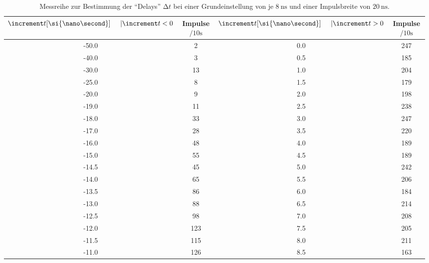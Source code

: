 \begin{table}
    \centering
    \caption{Messreihe zur Bestimmung der \enquote{Delays} $\increment t$ bei einer Grundeinstellung von je $\SI{8}{\nano\second}$ und einer Impulsbreite von $\SI{20}{\nano\second}$. } 
    \label{tab:MessreiheDelay20ns}
    \begin{tabular}{c c || c c}
        \toprule
        $\increment t [\si{\nano\second}] \hspace{0.5cm}| \increment t < 0 $ & Impulse $\si{\per{10}\second} $ & $\increment t [\si{\nano\second}] \hspace{0.5cm}|\increment t > 0 $ & Impulse $\si{\per{10}\second}$ \\
        \midrule
            -50.0    &      2     &   0.0       &     247   \\               
            -40.0    &      3     &   0.5     &     185   \\ 
            -30.0    &      13    &   1.0       &     204   \\     
            -25.0    &      8     &   1.5     &     179   \\ 
            -20.0    &      9     &   2.0       &     198   \\     
            -19.0    &      11    &   2.5     &     238   \\  
            -18.0    &      33    &   3.0       &     247   \\     
            -17.0    &      28    &   3.5     &     220   \\  
            -16.0    &      48    &   4.0       &     189   \\     
            -15.0    &      55    &   4.5     &     189   \\     
            -14.5  &      45    &   5.0       &     242   \\     
            -14.0    &      65    &   5.5     &     206   \\  
            -13.5  &      86    &   6.0       &     184   \\     
            -13.0    &      88    &   6.5     &     214   \\  
            -12.5  &      98    &   7.0       &     208   \\     
            -12.0    &      123   &   7.5     &     205   \\   
            -11.5  &      115   &   8.0       &     211   \\      
            -11.0    &      126   &   8.5     &     163   \\   

\end{tabular}
\end{table}
